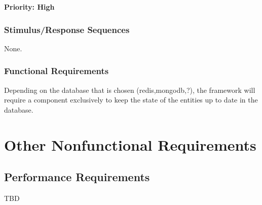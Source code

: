 \documentclass{scrreprt}
\begin{document}
\textbf{Priority: High}

\subsection{Stimulus/Response Sequences}

None.

\subsection{Functional Requirements}


Depending on the database that is chosen (redis,mongodb,?), the framework will require a component exclusively to keep the state of the entities up to date in the database.


\chapter{Other Nonfunctional Requirements}

\section{Performance Requirements}
TBD
\end{document}
